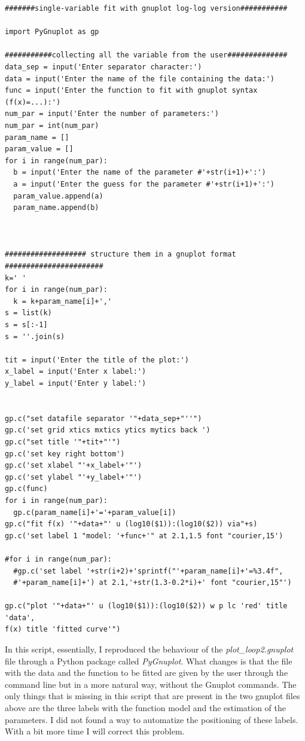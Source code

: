 \documentclass[prb,9pt,notitlepage]{revtex4-1}
\begin{document}
\begin{lstlisting}
#######single-variable fit with gnuplot log-log version###########

import PyGnuplot as gp

###########collecting all the variable from the user##############
data_sep = input('Enter separator character:')
data = input('Enter the name of the file containing the data:')
func = input('Enter the function to fit with gnuplot syntax (f(x)=...):')
num_par = input('Enter the number of parameters:')
num_par = int(num_par)
param_name = []
param_value = []
for i in range(num_par):
  b = input('Enter the name of the parameter #'+str(i+1)+':')
  a = input('Enter the guess for the parameter #'+str(i+1)+':')
  param_value.append(a)
  param_name.append(b)



################### structure them in a gnuplot format #######################
k=' '
for i in range(num_par):
  k = k+param_name[i]+','
s = list(k)
s = s[:-1]
s = ''.join(s)

tit = input('Enter the title of the plot:')
x_label = input('Enter x label:')
y_label = input('Enter y label:')


gp.c("set datafile separator '"+data_sep+"''")
gp.c('set grid xtics mxtics ytics mytics back ')
gp.c("set title '"+tit+"'")
gp.c('set key right bottom')
gp.c('set xlabel "'+x_label+'"')
gp.c('set ylabel "'+y_label+'"')
gp.c(func)
for i in range(num_par):
  gp.c(param_name[i]+'='+param_value[i])
gp.c("fit f(x) '"+data+"' u (log10($1)):(log10($2)) via"+s)
gp.c('set label 1 "model: '+func+'" at 2.1,1.5 font "courier,15')

#for i in range(num_par):
  #gp.c('set label '+str(i+2)+'sprintf("'+param_name[i]+'=%3.4f",
  #'+param_name[i]+') at 2.1,'+str(1.3-0.2*i)+' font "courier,15"')

gp.c("plot '"+data+"' u (log10($1)):(log10($2)) w p lc 'red' title 'data',
f(x) title 'fitted curve'")
\end{lstlisting}
In this script, essentially, I reproduced the behaviour of the \textit{plot\_loop2.gnuplot} file through a Python package called \textit{PyGnuplot}. What changes is that the file with the data and the function to be fitted are given by the user through the command line but in a more natural way, without the Gnuplot commands. The only things that is missing in this script that are present in the two gnuplot files above are the three labels with the function model and the estimation of the parameters. I did not found a way to automatize the positioning of these labels. With a bit more time I will correct this problem.
\end{document}
